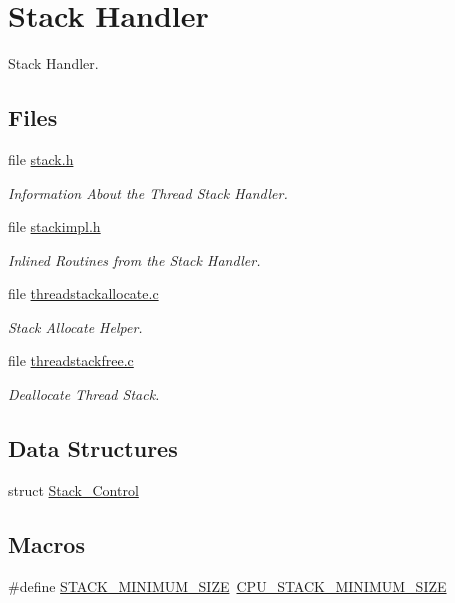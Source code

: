 \hypertarget{group__RTEMSScoreStack}{}\section{Stack Handler}
\label{group__RTEMSScoreStack}


Stack Handler.  


\subsection*{Files}
\begin{DoxyCompactItemize}
\item 
file \mbox{\hyperlink{cpukit_2include_2rtems_2score_2stack_8h}{stack.\+h}}
\begin{DoxyCompactList}\small\item\em Information About the Thread Stack Handler. \end{DoxyCompactList}\item 
file \mbox{\hyperlink{stackimpl_8h}{stackimpl.\+h}}
\begin{DoxyCompactList}\small\item\em Inlined Routines from the Stack Handler. \end{DoxyCompactList}\item 
file \mbox{\hyperlink{threadstackallocate_8c}{threadstackallocate.\+c}}
\begin{DoxyCompactList}\small\item\em Stack Allocate Helper. \end{DoxyCompactList}\item 
file \mbox{\hyperlink{threadstackfree_8c}{threadstackfree.\+c}}
\begin{DoxyCompactList}\small\item\em Deallocate Thread Stack. \end{DoxyCompactList}\end{DoxyCompactItemize}
\subsection*{Data Structures}
\begin{DoxyCompactItemize}
\item 
struct \mbox{\hyperlink{structStack__Control}{Stack\+\_\+\+Control}}
\end{DoxyCompactItemize}
\subsection*{Macros}
\begin{DoxyCompactItemize}
\item 
\#define \mbox{\hyperlink{group__RTEMSScoreStack_gaef3654e2c6c9afbd5dbe22b84fc22fc5}{S\+T\+A\+C\+K\+\_\+\+M\+I\+N\+I\+M\+U\+M\+\_\+\+S\+I\+ZE}}~\mbox{\hyperlink{sparc_2include_2rtems_2score_2cpu_8h_a4c92ceea7549cc7b21db2c466916b733}{C\+P\+U\+\_\+\+S\+T\+A\+C\+K\+\_\+\+M\+I\+N\+I\+M\+U\+M\+\_\+\+S\+I\+ZE}}
\end{DoxyCompactItemize}
